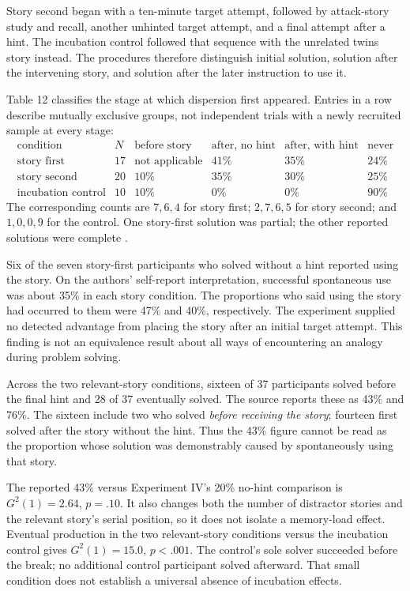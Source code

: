 Story second began with a ten-minute target attempt,
followed by attack-story study and recall, another
unhinted target attempt, and a final attempt after
a hint. The incubation control followed that sequence
with the unrelated twins story instead. The procedures
therefore distinguish initial solution, solution after
the intervening story, and solution after the later
instruction to use it.

Table 12 classifies the stage at which dispersion first
appeared. Entries in a row describe mutually exclusive
groups, not independent trials with a newly recruited
sample at every stage:
\[
\begin{array}{l|r|rrrr}
 \text{condition}&N&\text{before story}&
 \text{after, no hint}&\text{after, with hint}&\text{never}\\ \hline
 \text{story first}&17&\text{not applicable}&41\%&35\%&24\%\\
 \text{story second}&20&10\%&35\%&30\%&25\%\\
 \text{incubation control}&10&10\%&0\%&0\%&90\%
\end{array}
\]
The corresponding counts are \(7,6,4\) for story first;
\(2,7,6,5\) for story second; and \(1,0,0,9\) for
the control. One story-first solution was partial;
the other reported solutions were complete
\cite[pp.~343--346]{GickHolyoak1980AnalogicalProblemSolving}.

Six of the seven story-first participants who solved
without a hint reported using the story. On the
authors' self-report interpretation, successful
spontaneous use was about 35\% in each story condition.
The proportions who said using the story had occurred
to them were 47\% and 40\%, respectively.
The experiment supplied no detected advantage from
placing the story after an initial target attempt.
This finding is not an equivalence result about all
ways of encountering an analogy during problem solving.

Across the two relevant-story conditions, sixteen of
37 participants solved before the final hint and
28 of 37 eventually solved. The source reports these
as 43\% and 76\%. The sixteen include two who solved
\emph{before receiving the story}; fourteen first
solved after the story without the hint. Thus the
43\% figure cannot be read as the proportion whose
solution was demonstrably caused by spontaneously
using that story.

The reported 43\% versus Experiment IV's 20\% no-hint
comparison is \(G^2(1)=2.64\), \(p=.10\).
It also changes both the number of distractor stories
and the relevant story's serial position, so it does
not isolate a memory-load effect. Eventual production
in the two relevant-story conditions versus the
incubation control gives \(G^2(1)=15.0\), \(p<.001\).
The control's sole solver succeeded before the break;
no additional control participant solved afterward.
That small condition does not establish a universal
absence of incubation effects.

